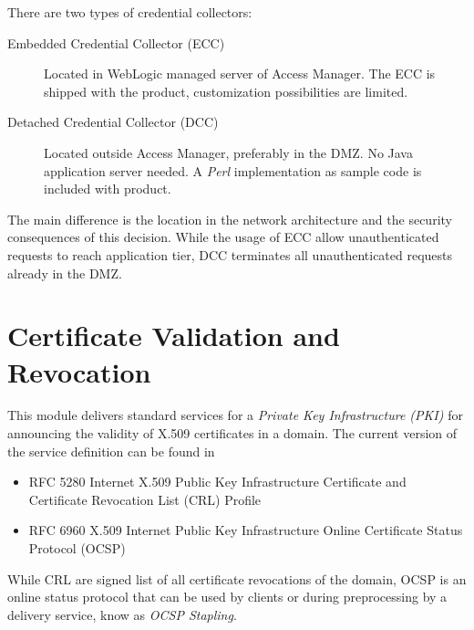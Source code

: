 \documentclass[11pt]{report}
\begin{document}
There are two types of credential collectors:

\begin{description}

    \item[Embedded Credential Collector (ECC)] Located in 
        WebLogic managed server of Access Manager. The ECC is shipped
        with the product, customization possibilities are limited.

    \item[Detached Credential Collector (DCC)] Located outside 
        Access Manager, preferably in the DMZ\@. No Java application
        server needed. A \emph{Perl} implementation as sample code is 
        included with product.

\end{description}

The main difference is the location in the network architecture and the
security consequences of this decision. While the usage of ECC allow 
unauthenticated requests to reach application tier, DCC terminates all
unauthenticated requests already in the DMZ\@. 



\section{Certificate Validation and Revocation}

This module delivers standard services for a \emph{Private Key
Infrastructure (PKI)} for announcing the validity of X.509 certificates
in a domain. The current version of the service definition can be found
in 

\begin{itemize}

    \item RFC 5280 Internet X.509 Public Key Infrastructure Certificate
        and Certificate Revocation List (CRL) Profile

    \item RFC 6960 X.509 Internet Public Key Infrastructure Online
        Certificate Status Protocol (OCSP)

\end{itemize}

While CRL are signed list of all certificate revocations of the domain,
OCSP is an online status protocol that can be used by clients or 
during preprocessing by a delivery service, know as \emph{OCSP Stapling}.


\end{document}
